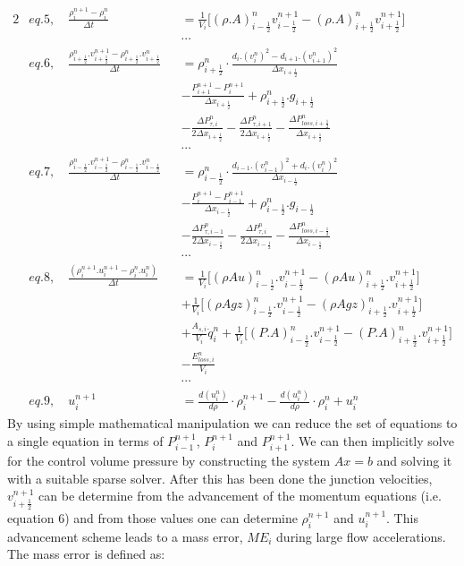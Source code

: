 \documentclass[11pt,letterpaper,titlepage]{article}
\newcommand{\half}{\frac{1}{2}}
\begin{document}
\begin{alignat*}{2}
&eq.5, \quad      \frac{\rho_i^{n+1} - \rho_i^{n}}{\Delta t} &&= \frac{1}{V_i}\biggr[ (\rho.A)_{i-\half}^{n}v_{i-\half}^{n+1}-(\rho.A)_{i+\half}^{n} v_{i+\half}^{n+1} \biggr] \\
& &&\cdots\\
&eq.6, \quad      \frac{\rho_{i+\half}^{n}.v_{i+\half}^{n+1}-\rho_{i+\half}^n.v_{i+\half}^n}{\Delta t} &&= \rho_{i+\half}^n\cdot\frac{d_i.(v_{i}^n)^2-d_{i+1}.(v_{i+1}^n)^2}{\Delta x_{i+\half}}     \\
& &&-\frac{P_{i+1}^{n+1}-P_i^{n+1}}{\Delta x_{i+\half}} +\rho_{i+\half}^n.g_{i+\half} \\
& &&-\frac{\Delta P_{\tau,i}^n }{2\Delta x_{i+\half}}- \frac{\Delta P_{\tau,i+1}^n }{2\Delta x_{i+\half}} -\frac{\Delta P_{loss,i+\half}^n}{\Delta x_{i+\half}} \\
& &&\cdots\\
&eq.7, \quad      \frac{\rho_{i-\half}^{n}.v_{i-\half}^{n+1}-\rho_{i-\half}^n.v_{i-\half}^n}{\Delta t} &&= \rho_{i-\half}^n\cdot\frac{d_{i-1}.(v_{i-1}^n)^2+d_{i}.(v_{i}^n)^2}{\Delta x_{i-\half}}     \\
& &&-\frac{P_{i}^{n+1}-P_{i-1}^{n+1}}{\Delta x_{i-\half}} +\rho_{i-\half}^n.g_{i-\half} \\
& &&-\frac{\Delta P_{\tau,i-1}^n }{2\Delta x_{i-\half}}- \frac{\Delta P_{\tau,i}^n }{2\Delta x_{i-\half}} -\frac{\Delta P_{loss,i-\half}^n}{\Delta x_{i-\half}} \\
& &&\cdots\\
&eq.8, \quad      \frac{(\rho_i^{n+1}.u_i^{n+1}-  \rho_i^{n}.u_i^{n})}{\Delta t}&&=\frac{1}{V_i}\biggr[ (\rho Au)_{i-\half}^n.v_{i-\half}^{n+1} -(\rho Au)_{i+\half}^n.v_{i+\half}^{n+1} \biggr] \\
& &&+\frac{1}{V_i}\biggr[ (\rho Agz)_{i-\half}^n.v_{i-\half}^{n+1} -(\rho Agz)_{i+\half}^n.v_{i+\half}^{n+1} \biggr] \\
& &&+\frac{A_{s,i}}{V_i}\dot{q}_i^n + \frac{1}{V_i}\biggr[   (P.A)_{i-\half}^n.v_{i-\half}^{n+1} - (P.A)_{i+\half}^n.v_{i+\half}^{n+1}   \biggr] \\
& &&- \frac{E_{loss,i}^n}{V_i} \\
& &&\cdots\\
&eq.9, \quad      u_{i}^{n+1} &&= \frac{d(u_i^{n})}{d\rho}\cdot \rho_{i}^{n+1} -\frac{d(u_i^{n})}{d\rho}\cdot\rho_{i}^{n} +  u_{i}^{n}   
\end{alignat*}
\newline
By using simple mathematical manipulation we can reduce the set of equations to a single equation in terms of $P_{i-1}^{n+1}$, $P_{i}^{n+1}$ and $P_{i+1}^{n+1}$. We can then implicitly solve for the control volume pressure by constructing the system $Ax=b$ and solving it with a suitable sparse solver. After this has been done the junction velocities, $v_{i+\half}^{n+1}$ can be determine from the advancement of the momentum equations (i.e. equation 6) and from those values one can determine $\rho_i^{n+1}$ and $u_i^{n+1}$.
\newline
\newline
This advancement scheme leads to a mass error, $ME_i$ during large flow accelerations. The mass error is defined as:
\end{document}

